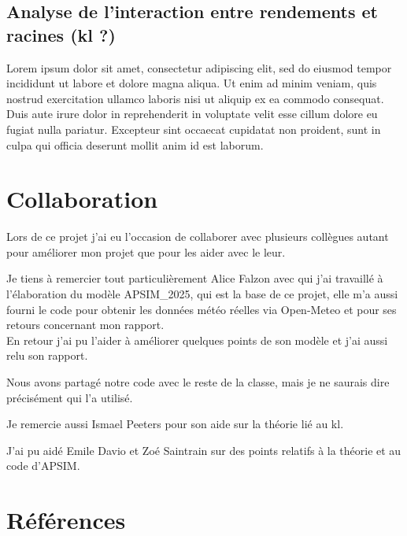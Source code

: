 \documentclass[
]{article}
\begin{document}
\subsection{Analyse de l'interaction entre rendements et racines (kl
?)}\label{analyse-de-linteraction-entre-rendements-et-racines-kl}

Lorem ipsum dolor sit amet, consectetur adipiscing elit, sed do eiusmod
tempor incididunt ut labore et dolore magna aliqua. Ut enim ad minim
veniam, quis nostrud exercitation ullamco laboris nisi ut aliquip ex ea
commodo consequat. Duis aute irure dolor in reprehenderit in voluptate
velit esse cillum dolore eu fugiat nulla pariatur. Excepteur sint
occaecat cupidatat non proident, sunt in culpa qui officia deserunt
mollit anim id est laborum.

\section{Collaboration}\label{collaboration}

Lors de ce projet j'ai eu l'occasion de collaborer avec plusieurs
collègues autant pour améliorer mon projet que pour les aider avec le
leur.

Je tiens à remercier tout particulièrement Alice Falzon avec qui j'ai
travaillé à l'élaboration du modèle APSIM\_2025, qui est la base de ce
projet, elle m'a aussi fourni le code pour obtenir les données météo
réelles via Open-Meteo et pour ses retours concernant mon rapport.\\
En retour j'ai pu l'aider à améliorer quelques points de son modèle et
j'ai aussi relu son rapport.

Nous avons partagé notre code avec le reste de la classe, mais je ne
saurais dire précisément qui l'a utilisé.

Je remercie aussi Ismael Peeters pour son aide sur la théorie lié au kl.

J'ai pu aidé Emile Davio et Zoé Saintrain sur des points relatifs à la
théorie et au code d'APSIM.

\section*{Références}\label{ruxe9fuxe9rences}
\end{document}
